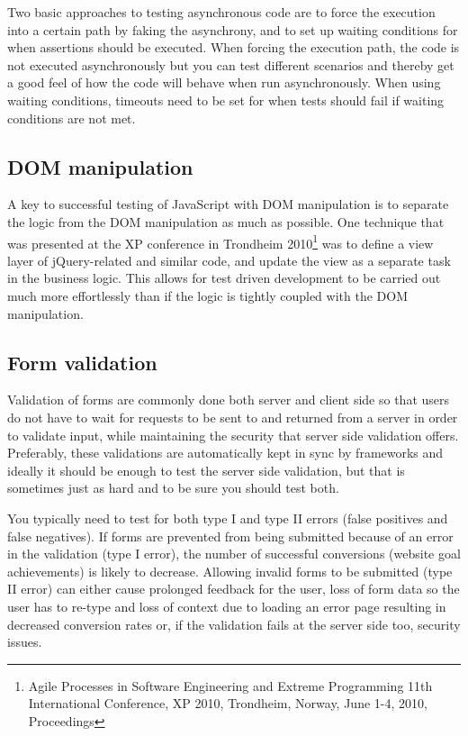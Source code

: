 \documentclass[11pt]{article}
\begin{document}
Two basic approaches to testing asynchronous code are to force the execution into a certain path by faking the asynchrony, and to set up waiting conditions for when assertions should be executed. When forcing the execution path, the code is not executed asynchronously but you can test different scenarios and thereby get a good feel of how the code will behave when run asynchronously. When using waiting conditions, timeouts need to be set for when tests should fail if waiting conditions are not met.

\subsection{DOM manipulation}

A key to successful testing of JavaScript with DOM manipulation is to separate the logic from the DOM manipulation as much as possible. One technique that was presented at the XP conference in Trondheim 2010\footnote{Agile Processes in Software Engineering and Extreme Programming 11th International Conference, XP 2010, Trondheim, Norway, June 1-4, 2010, Proceedings} was to define a view layer of jQuery-related and similar code, and update the view as a separate task in the business logic. This allows for test driven development to be carried out much more effortlessly than if the logic is tightly coupled with the DOM manipulation. \cite[question~4]{Ahnve}

\subsection{Form validation}

Validation of forms are commonly done both server and client side so that users do not have to wait for requests to be sent to and returned from a server in order to validate input, while maintaining the security that server side validation offers. Preferably, these validations are automatically kept in sync by frameworks and ideally it should be enough to test the server side validation, but that is sometimes just as hard and to be sure you should test both.

You typically need to test for both type I and type II errors (false positives and false negatives). If forms are prevented from being submitted because of an error in the validation (type I error), the number of successful conversions (website goal achievements) is likely to decrease. Allowing invalid forms to be submitted (type II error) can either cause prolonged feedback for the user, loss of form data so the user has to re-type and loss of context due to loading an error page resulting in decreased conversion rates or, if the validation fails at the server side too, security issues.
\end{document}
